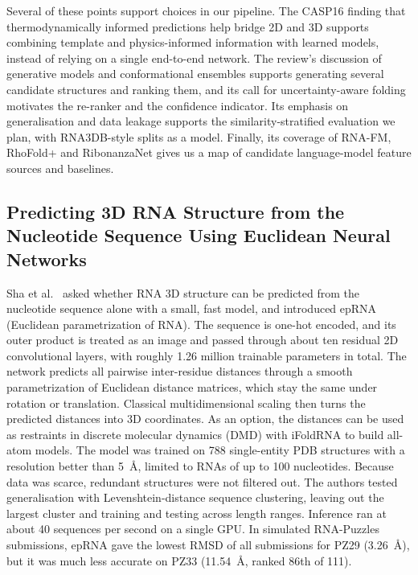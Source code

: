 \documentclass{FastFyp}
\begin{document}
Several of these points support choices in our pipeline. The CASP16 finding that thermodynamically informed predictions help bridge 2D and 3D supports combining template and physics-informed information with learned models, instead of relying on a single end-to-end network. The review's discussion of generative models and conformational ensembles supports generating several candidate structures and ranking them, and its call for uncertainty-aware folding motivates the re-ranker and the confidence indicator. Its emphasis on generalisation and data leakage supports the similarity-stratified evaluation we plan, with RNA3DB-style splits as a model. Finally, its coverage of RNA-FM, RhoFold+ and RibonanzaNet gives us a map of candidate language-model feature sources and baselines.

\subsection{Predicting 3D RNA Structure from the Nucleotide Sequence Using Euclidean Neural Networks}
Sha et al.~\cite{sha2024eprna} asked whether RNA 3D structure can be predicted from the nucleotide sequence alone with a small, fast model, and introduced epRNA (Euclidean parametrization of RNA). The sequence is one-hot encoded, and its outer product is treated as an image and passed through about ten residual 2D convolutional layers, with roughly 1.26 million trainable parameters in total. The network predicts all pairwise inter-residue distances through a smooth parametrization of Euclidean distance matrices, which stay the same under rotation or translation. Classical multidimensional scaling then turns the predicted distances into 3D coordinates. As an option, the distances can be used as restraints in discrete molecular dynamics (DMD) with iFoldRNA to build all-atom models. The model was trained on 788 single-entity PDB structures with a resolution better than 5~\AA{}, limited to RNAs of up to 100 nucleotides. Because data was scarce, redundant structures were not filtered out. The authors tested generalisation with Levenshtein-distance sequence clustering, leaving out the largest cluster and training and testing across length ranges. Inference ran at about 40 sequences per second on a single GPU. In simulated RNA-Puzzles submissions, epRNA gave the lowest RMSD of all submissions for PZ29 (3.26~\AA{}), but it was much less accurate on PZ33 (11.54~\AA{}, ranked 86th of 111).
\end{document}
